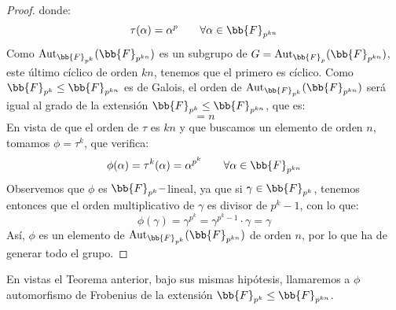 \begin{teo}
\begin{proof}
        donde:
        \begin{equation*}
            \tau(\alpha) = \alpha^p \qquad \forall \alpha\in \bb{F}_{p^{kn}}
        \end{equation*}
        Como $\Aut_{\bb{F}_{p^k}}(\bb{F}_{p^{kn}})$ es un subgrupo de $G = \Aut_{\bb{F}_p}(\bb{F}_{p^{kn}})$, este último cíclico de orden $kn$, tenemos que el primero es cíclico. Como $\bb{F}_{p^k}\leq \bb{F}_{p^{kn}}$ es de Galois, el orden de $\Aut_{\bb{F}_{p^k}}(\bb{F}_{p^{kn}})$ será igual al grado de la extensión $\bb{F}_{p^k}\leq \bb{F}_{p^{kn}}$, que es:
        \begin{equation*}
            [\bb{F}_{p^{kn}} : \bb{F}_{p^k}] = n 
        \end{equation*}
        En vista de que el orden de $\tau$ es $kn$ y que buscamos un elemento de orden $n$, tomamos $\phi = \tau^k$, que verifica:
        \begin{equation*}
            \phi(\alpha) = \tau^k(\alpha) = \alpha^{p^k} \qquad \forall \alpha \in \bb{F}_{p^{kn}}
        \end{equation*}
        Observemos que $\phi$ es $\bb{F}_{p^k}-$lineal, ya que si $\gamma \in \bb{F}_{p^k}$, tenemos entonces que el orden multiplicativo de $\gamma$ es divisor de $p^k-1$, con lo que:
        \begin{equation*}
            \phi(\gamma) = \gamma^{p^k} = \gamma^{p^k-1}\cdot  \gamma = \gamma
        \end{equation*}
        Así, $\phi$ es un elemento de $\Aut_{\bb{F}_{p^k}}(\bb{F}_{p^{kn}})$ de orden $n$, por lo que ha de generar todo el grupo.
    \end{proof}
\end{teo}

\begin{notacion}
    En vistas el Teorema anterior, bajo sus mismas hipótesis, llamaremos a $\phi$ automorfismo de Frobenius de la extensión $\bb{F}_{p^k}\leq \bb{F}_{p^{kn}}$.
\end{notacion}

